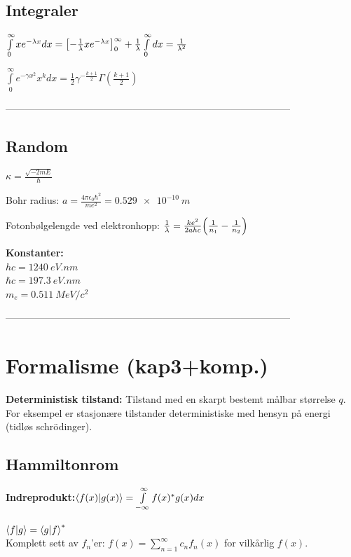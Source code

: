 \documentclass[10p,a4paper]{extarticle}
\renewcommand{\exp}{e^}
\newcommand{\half}{\frac{1}{2}}
\begin{document}
\begin{multicols}{2}



\subsection*{Integraler}
$\int\limits_0^\infty x\exp{-\lambda x} dx = \qty[-\frac{1}{\lambda}x\exp{-\lambda x}]_0^\infty + \frac{1}{\lambda}\int\limits_0^\infty dx = \frac{1}{\lambda^2}$

$\int\limits_0^\infty \exp{-\gamma x^2} x^k dx = \half \gamma^{-\frac{k+1}{2}}\Gamma(\frac{k+1}{2})$

---------------------------------------------------------------------------------------

\subsection*{Random}
$\kappa = \frac{\sqrt{-2mE}}{\hbar}$

Bohr radius: $a = \frac{4\pi\epsilon_0\hbar^2}{me^2} = \SI{0.529e-10}{m}$

Fotonbølgelengde ved elektronhopp: $\frac{1}{\lambda} = \frac{ke^2}{2ahc}\qty(\frac{1}{n_1}-\frac{1}{n_2})$

\textbf{Konstanter:}\\
$hc = \SI{1240}{eV.nm}$\\
$\hbar c = \SI{197.3}{eV.nm}$\\
$m_e = \SI{0.511}{MeV/c^2}$


---------------------------------------------------------------------------------------


\section*{Formalisme (kap3+komp.)}
\textbf{Deterministisk tilstand:} Tilstand med en skarpt bestemt målbar størrelse $q$. For eksempel er stasjonære tilstander deterministiske med hensyn på energi (tidløs schrödinger).

\subsection*{Hammiltonrom}
\textbf{Indreprodukt:}$\bra{f(x)}\ket{g(x)} = \int\limits_{-\infty}^\infty f(x)^*g(x) dx$

$\bra{f}\ket{g} = \bra{g}\ket{f}^*$
\\

Komplett sett av $f_n$'er: $f(x) = \sum\limits_{n=1}^\infty c_n f_n(x)$ for vilkårlig $f(x)$.


\end{multicols}
\end{document}
